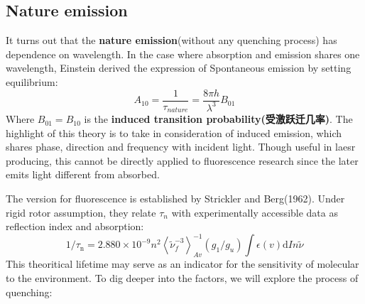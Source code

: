\documentclass[12pt]{ctexart}
\begin{document}
\subsection*{Nature emission}
It turns out that the \textbf{nature emission}(without any quenching process) has dependence on wavelength. In the case where absorption and emission shares one wavelength, Einstein derived the expression of Spontaneous emission by setting equilibrium:
\begin{equation}
    A_{10}=\frac{1}{\tau_{nature}}=\frac{8\pi h}{\lambda^3}B_{01}
\end{equation}
Where $B_{01}=B_{10}$ is the \textbf{induced transition probability(受激跃迁几率)}. The highlight of this theory is to take in consideration of induced emission, which shares phase, direction and frequency with incident light. Though useful in laesr producing, this cannot be directly applied to fluorescence research since the later emits light different from absorbed. 
\par The version for fluorescence is established by Strickler and Berg(1962). Under rigid rotor assumption, they relate $\tau_n$ with experimentally accessible data as reflection index and absorption:
\begin{equation}
    1 / \tau_{\mathrm{n}}=2.880 \times 10^{-9} n^{2}\left\langle\widetilde{\nu}_{f}^{-3}\right\rangle_{Av}^{-1}\left(g_{1} / g_{u}\right) \int \epsilon(v) \mathrm{d} I n \widetilde{\nu}
\end{equation}
This theoritical lifetime may serve as an indicator for the sensitivity of molecular to the environment. To dig deeper into the factors, we will explore the process of quenching:
\end{document}
